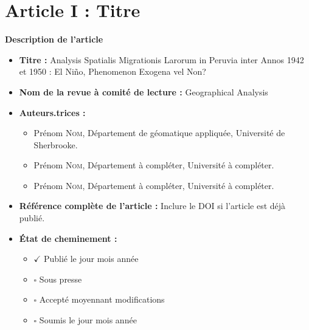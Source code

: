 \chapter{Article I : Titre} \label{chap:article1}

{\large \textbf{Description de l’article}}

\begin{itemize}
  \item \textbf{Titre :} Analysis Spatialis Migrationis Larorum in Peruvia inter Annos 1942 et 1950 : El Niño, Phenomenon Exogena vel Non?
  
  \item \textbf{Nom de la revue à comité de lecture :} Geographical Analysis
  
  \item \textbf{Auteurs.trices :}
    \begin{itemize}
    \item Prénom \textsc{Nom}, Département de géomatique appliquée, Université de Sherbrooke.
    \item Prénom \textsc{Nom}, Département à compléter, Université à compléter.
    \item Prénom \textsc{Nom}, Département à compléter, Université à compléter.
  \end{itemize}
  \item \textbf{Référence complète de l'article :} Inclure le DOI si l'article est déjà publié.

  \item \textbf{État de cheminement :}
        \begin{itemize}
            \item $\checkmark$ Publié le jour mois année
            \item $\square$ Sous presse
            \item $\square$ Accepté moyennant modifications
            \item $\square$ Soumis le jour mois année
   \end{itemize}



\end{itemize}
